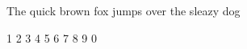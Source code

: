 \documentclass[a4paper]{article}
\newcommand{\frase}{The quick brown fox jumps over the sleazy dog}
\begin{document}
\normalfont\hunclfamily

\frase

1 2 3 4 5 6 7 8 9 0
\end{document}
